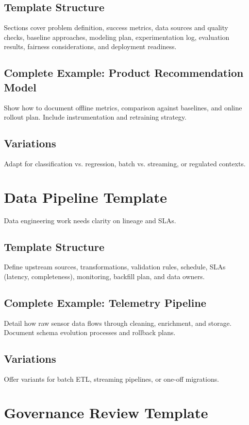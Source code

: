 \subsection{Template Structure}
Sections cover problem definition, success metrics, data sources and quality checks, baseline approaches, modeling plan, experimentation log, evaluation results, fairness considerations, and deployment readiness.

\subsection{Complete Example: Product Recommendation Model}
Show how to document offline metrics, comparison against baselines, and online rollout plan. Include instrumentation and retraining strategy.

\subsection{Variations}
Adapt for classification vs. regression, batch vs. streaming, or regulated contexts.

\section{Data Pipeline Template}
\label{sec:pipeline-template}

Data engineering work needs clarity on lineage and SLAs.

\subsection{Template Structure}
Define upstream sources, transformations, validation rules, schedule, SLAs (latency, completeness), monitoring, backfill plan, and data owners.

\subsection{Complete Example: Telemetry Pipeline}
Detail how raw sensor data flows through cleaning, enrichment, and storage. Document schema evolution processes and rollback plans.

\subsection{Variations}
Offer variants for batch ETL, streaming pipelines, or one-off migrations.

\section{Governance Review Template}
\label{sec:governance-template}


